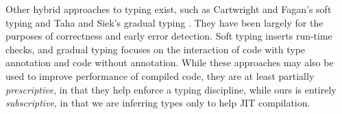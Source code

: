 Other hybrid approaches to typing exist, such as Cartwright and Fagan's soft
typing and Taha and Siek's gradual typing \cite{Cartwright91, Siek07}. They
have been largely for the purposes of correctness and early error
detection. Soft typing inserts run-time checks, and gradual typing focuses on
the interaction of code with type annotation and code without
annotation. While these approaches may also be used to improve performance of
compiled code, they are at least partially \emph{prescriptive}, in that they
help enforce a typing discipline, while ours is entirely \emph{subscriptive}, in that
we are inferring types only to help JIT compilation.


